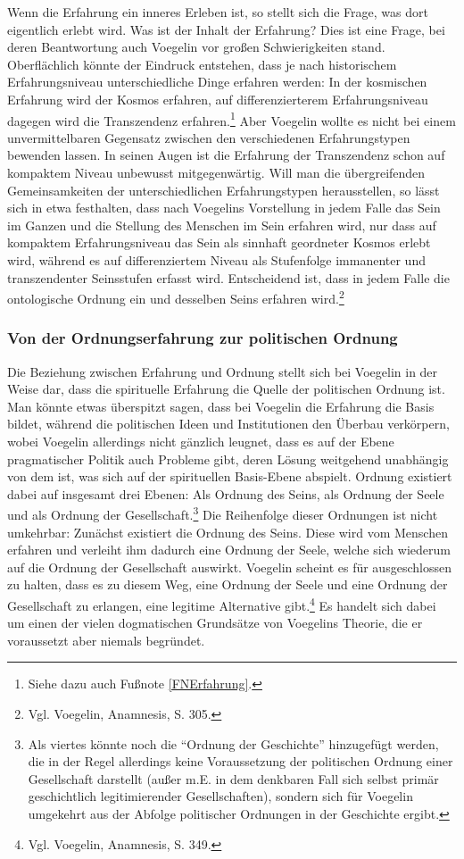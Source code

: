 Wenn die Erfahrung ein inneres Erleben ist, so stellt sich die Frage, was dort
eigentlich erlebt wird. Was ist der Inhalt der Erfahrung? Dies ist eine Frage,
bei deren Beantwortung auch Voegelin vor großen Schwierigkeiten stand.
Oberflächlich könnte der Eindruck entstehen, dass je nach historischem
Erfahrungsniveau unterschiedliche Dinge erfahren werden: In der kosmischen
Erfahrung wird der Kosmos erfahren, auf differenzierterem Erfahrungsniveau
dagegen wird die Transzendenz erfahren.\footnote{Siehe dazu auch Fußnote
  \ref{FNErfahrung}.} Aber Voegelin wollte es nicht bei einem unvermittelbaren
Gegensatz zwischen den verschiedenen Erfahrungstypen bewenden lassen. In
seinen Augen ist die Erfahrung der Transzendenz schon auf kompaktem Niveau
unbewusst mitgegenwärtig. Will man die übergreifenden Gemeinsamkeiten der
unterschiedlichen Erfahrungstypen herausstellen, so lässt sich in etwa
festhalten, dass nach Voegelins Vorstellung in jedem Falle das Sein im Ganzen
und die Stellung des Menschen im Sein erfahren wird, nur dass auf kompaktem
Erfahrungsniveau das Sein als sinnhaft geordneter Kosmos erlebt wird, während
es auf differenziertem Niveau als Stufenfolge immanenter und transzendenter
Seinsstufen erfasst wird.  Entscheidend ist, dass in jedem Falle die
ontologische Ordnung ein und desselben Seins erfahren wird.\footnote{Vgl.
  Voegelin, Anamnesis, S. 305.}

\subsubsection{Von der Ordnungserfahrung zur politischen Ordnung}

Die Beziehung zwischen Erfahrung und Ordnung stellt sich bei Voegelin in der
Weise dar, dass die spirituelle Erfahrung die Quelle der politischen Ordnung
ist. Man könnte etwas überspitzt sagen, dass bei Voegelin die Erfahrung die
Basis bildet, während die politischen Ideen und Institutionen den Überbau
verkörpern, wobei Voegelin allerdings nicht gänzlich leugnet, dass es auf der
Ebene pragmatischer Politik auch Probleme gibt, deren Lösung weitgehend
unabhängig von dem ist, was sich auf der spirituellen Basis-Ebene abspielt.
Ordnung existiert dabei auf insgesamt drei Ebenen: Als Ordnung des Seins, als
Ordnung der Seele und als Ordnung der Gesellschaft.\footnote{Als viertes
  könnte noch die "`Ordnung der Geschichte"' hinzugefügt werden, die in der
  Regel allerdings keine Voraussetzung der politischen Ordnung einer
  Gesellschaft darstellt (außer m.E. in dem denkbaren Fall sich selbst primär
  geschichtlich legitimierender Gesellschaften), sondern sich für Voegelin
  umgekehrt aus der Abfolge politischer Ordnungen in der Geschichte ergibt.}
Die Reihenfolge dieser Ordnungen ist nicht umkehrbar: Zunächst existiert die
Ordnung des Seins. Diese wird vom Menschen erfahren und verleiht ihm dadurch
eine Ordnung der Seele, welche sich wiederum auf die Ordnung der Gesellschaft
auswirkt.  Voegelin scheint es für ausgeschlossen zu halten, dass es zu diesem
Weg, eine Ordnung der Seele und eine Ordnung der Gesellschaft zu erlangen,
eine legitime Alternative gibt.\footnote{Vgl. Voegelin, Anamnesis, S. 349.} Es
handelt sich dabei um einen der vielen dogmatischen Grundsätze von Voegelins
Theorie, die er voraussetzt aber niemals begründet.

